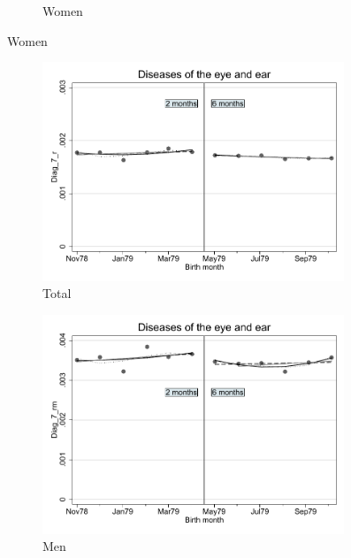 \documentclass[a4paper ]{article}
\begin{document}
\begin{figure}[h!]
\begin{subfigure}[t]{0.31\textwidth}
		\caption{Women}
	\end{subfigure}
\end{figure}
\newpage
\begin{figure}[h]
	\centering
	\begin{subfigure}[t]{0.31\textwidth}
		\centering
		\includegraphics[width=0.99\textwidth]{R1_RD_Diag_7_r_fits}
		\caption{Total}		
	\end{subfigure}
	\begin{subfigure}[t]{0.31\textwidth}
		\centering
		\includegraphics[width=0.99\textwidth]{R1_RD_Diag_7_rm_fits}
		\caption{Men}		
	\end{subfigure}
	\quad
	\begin{subfigure}[t]{0.31\textwidth}

\end{subfigure}
\end{figure}
\end{document}
